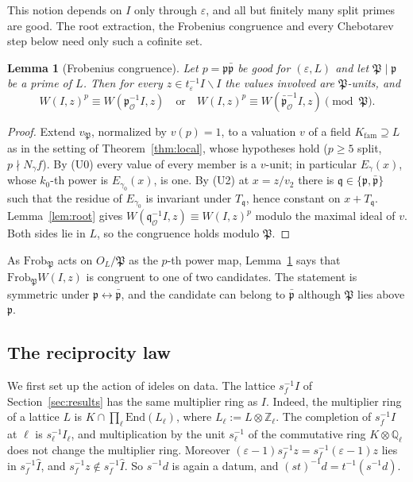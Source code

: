 \documentclass[11pt]{amsart}
\numberwithin{equation}{section}
\theoremstyle{plain}
\newtheorem{lemma}[theorem]{Lemma}
\theoremstyle{definition}
\theoremstyle{remark}
\begin{document}
This notion depends on \(I\) only through \(\varepsilon\), and all but finitely many split primes are good. The root extraction, the Frobenius congruence and every Chebotarev step below need only such a cofinite set.

\begin{lemma}[Frobenius congruence]\label{lem:frob}
Let \(p=\mathfrak p\bar{\mathfrak p}\) be good for \((\varepsilon,L)\) and let \(\mathfrak P\mid\mathfrak p\) be a prime of \(L\). Then for every \(z\in t_\varepsilon^{-1}I\smallsetminus I\) the values involved are \(\mathfrak P\)-units, and
\[W(I,z)^p\equiv W(\mathfrak p_{\mathcal O}^{-1}I,z)\quad\text{or}\quad W(I,z)^p\equiv W(\bar{\mathfrak p}_{\mathcal O}^{-1}I,z)\pmod{\mathfrak P}.\]
\end{lemma}

\begin{proof}
Extend \(v_{\mathfrak P}\), normalized by \(v(p)=1\), to a valuation \(v\) of a field \(K_{\mathrm{fam}}\supseteq L\) as in the setting of Theorem~\ref{thm:local}, whose hypotheses hold (\(p\ge5\) split, \(p\nmid N_\gamma f\)). By (U0) every value of every member is a \(v\)-unit; in particular \(E_\gamma(x)\), whose \(k_0\)-th power is \(E_{\gamma_0}(x)\), is one. By (U2) at \(x=z/v_2\) there is \(\mathfrak q\in\{\mathfrak p,\bar{\mathfrak p}\}\) such that the residue of \(E_{\gamma_0}\) is invariant under \(T_{\mathfrak q}\), hence constant on \(x+T_{\mathfrak q}\). Lemma~\ref{lem:root} gives \(W(\mathfrak q_{\mathcal O}^{-1}I,z)\equiv W(I,z)^p\) modulo the maximal ideal of \(v\). Both sides lie in \(L\), so the congruence holds modulo \(\mathfrak P\).
\end{proof}

As \(\mathrm{Frob}_{\mathfrak P}\) acts on \(O_L/\mathfrak P\) as the \(p\)-th power map, Lemma~\ref{lem:frob} says that \(\mathrm{Frob}_{\mathfrak P}W(I,z)\) is congruent to one of two candidates. The statement is symmetric under \(\mathfrak p\leftrightarrow\bar{\mathfrak p}\), and the candidate can belong to \(\bar{\mathfrak p}\) although \(\mathfrak P\) lies above \(\mathfrak p\).

\subsection{The reciprocity law}\label{sec:rec}

We first set up the action of ideles on data. The lattice \(s_f^{-1}I\) of Section~\ref{sec:results} has the same multiplier ring as \(I\). Indeed, the multiplier ring of a lattice \(L\) is \(K\cap\prod_\ell\mathrm{End}(L_\ell)\), where \(L_\ell:=L\otimes\mathbb Z_\ell\). The completion of \(s_f^{-1}I\) at \(\ell\) is \(s_\ell^{-1}I_\ell\), and multiplication by the unit \(s_\ell^{-1}\) of the commutative ring \(K\otimes\mathbb Q_\ell\) does not change the multiplier ring. Moreover \((\varepsilon-1)s_f^{-1}z=s_f^{-1}(\varepsilon-1)z\) lies in \(s_f^{-1}\widehat I\), and \(s_f^{-1}z\notin s_f^{-1}\widehat I\). So \(s^{-1}d\) is again a datum, and \((st)^{-1}d=t^{-1}(s^{-1}d)\).
\end{document}
